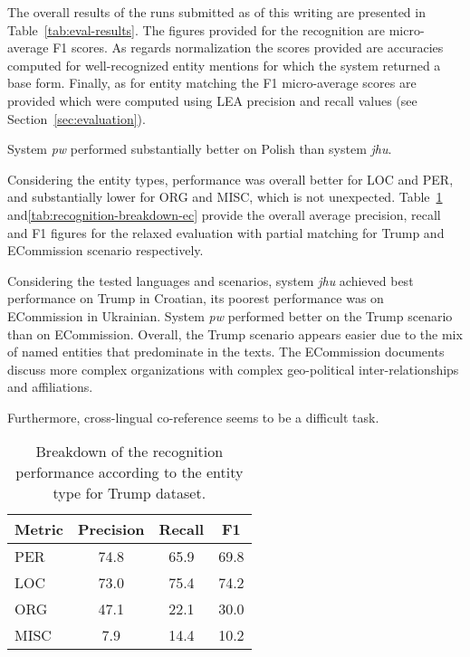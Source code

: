 \documentclass[11pt]{article}
\begin{document}
The overall results of the runs submitted as of this writing are presented in
Table~\ref{tab:eval-results}. The figures provided for the recognition are
micro-average F1 scores. 
As regards normalization the scores provided are
accuracies computed for well-recognized entity mentions for which the system
returned a base form. Finally, as for entity matching the F1 micro-average scores
are provided which were computed using LEA precision and recall values (see Section~\ref{sec:evaluation}).


System {\em pw} performed substantially better on Polish than system {\em
  jhu}.

Considering the entity types, performance was overall better for LOC and
PER, and substantially lower for ORG and MISC, which is not unexpected. 
Table~\ref{tab:recognition-breakdown-trump} and\ref{tab:recognition-breakdown-ec}
provide the overall average precision, recall and F1 figures for the relaxed evaluation
with partial matching for {\sc Trump} and {\sc ECommission} scenario respectively.

Considering the tested languages and scenarios, system {\em jhu} achieved
best performance on {\sc Trump} in Croatian, its poorest performance was on {\sc ECommission}
in Ukrainian.  System {\em pw} performed better on the {\sc Trump}
scenario than on {\sc ECommission}.  Overall, the {\sc Trump} scenario appears easier
due to the mix of named entities that predominate in the texts.  The {\sc ECommission} documents 
discuss more complex organizations with complex geo-political inter-relationships and affiliations.

Furthermore, cross-lingual co-reference seems to be a difficult task.


\begin{table}
  \begin{center}
    \begin{footnotesize}
      \begin{tabular}{lccc}
        \toprule 
        Metric & \textbf{Precision} & \textbf{Recall} & \textbf{F1} \\
        \midrule
        PER & 74.8 & 65.9 & 69.8 \\
        LOC & 73.0 & 75.4 & 74.2 \\
        ORG & 47.1 & 22.1 & 30.0 \\
        MISC & 7.9 & 14.4 & 10.2 \\
        \bottomrule
      \end{tabular}
    \end{footnotesize}
  \end{center}
  \caption{Breakdown of the recognition performance according to the entity type for {\sc Trump} dataset.}
  \label{tab:recognition-breakdown-trump}
\end{table}
\end{document}
